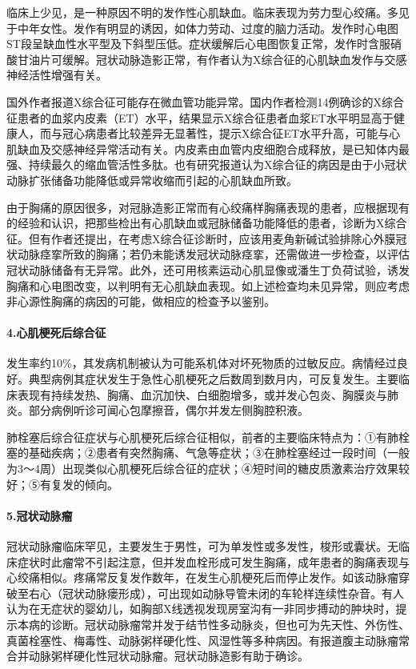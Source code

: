 临床上少见，是一种原因不明的发作性心肌缺血。临床表现为劳力型心绞痛。多见于中年女性。发作有明显的诱因，如体力劳动、过度的脑力活动。发作时心电图ST段呈缺血性水平型及下斜型压低。症状缓解后心电图恢复正常，发作时含服硝酸甘油片可缓解。冠状动脉造影正常，有作者认为X综合征的心肌缺血发作与交感神经活性增强有关。

国外作者报道X综合征可能存在微血管功能异常。国内作者检测14例确诊的X综合征患者的血浆内皮素（ET）水平，结果显示X综合征患者血浆ET水平明显高于健康人，而与冠心病患者比较差异无显著性，提示X综合征ET水平升高，可能与心肌缺血及交感神经异常活动有关。内皮素由血管内皮细胞合成释放，是已知体内最强、持续最久的缩血管活性多肽。也有研究报道认为X综合征的病因是由于小冠状动脉扩张储备功能降低或异常收缩而引起的心肌缺血所致。

由于胸痛的原因很多，对冠脉造影正常而有心绞痛样胸痛表现的患者，应根据现有的经验和认识，把那些检出有心肌缺血或冠脉储备功能降低的患者，诊断为X综合征。但有作者还提出，在考虑X综合征诊断时，应该用麦角新碱试验排除心外膜冠状动脉痉挛所致的胸痛；若仍未能诱发冠状动脉痉挛，还需做进一步检查，以评估冠状动脉储备有无异常。此外，还可用核素运动心肌显像或潘生丁负荷试验，诱发胸痛和心电图改变，以判明有无心肌缺血表现。如上述检查均未见异常，则应考虑非心源性胸痛的病因的可能，做相应的检查予以鉴别。

\paragraph{4.心肌梗死后综合征}

发生率约10\%，其发病机制被认为可能系机体对坏死物质的过敏反应。病情经过良好。典型病例其症状发生于急性心肌梗死之后数周到数月内，可反复发生。主要临床表现有持续发热、胸痛、血沉加快、白细胞增多，或并发心包炎、胸膜炎与肺炎。部分病例听诊可闻心包摩擦音，偶尔并发左侧胸腔积液。

肺栓塞后综合征症状与心肌梗死后综合征相似，前者的主要临床特点为：①有肺栓塞的基础疾病；②患者有突然胸痛、气急等症状；③在肺栓塞经过一段时间（一般为3～4周）出现类似心肌梗死后综合征的症状；④短时间的糖皮质激素治疗效果较好；⑤有复发的倾向。

\paragraph{5.冠状动脉瘤}

冠状动脉瘤临床罕见，主要发生于男性，可为单发性或多发性，梭形或囊状。无临床症状时此瘤常不引起注意，但并发血栓形成可发生胸痛，成年患者的胸痛表现与心绞痛相似。疼痛常反复发作数年，在发生心肌梗死后而停止发作。如该动脉瘤穿破至右心（冠状动脉瘘形成），可出现如动脉导管未闭的车轮样连续性杂音。有人认为在无症状的婴幼儿，如胸部X线透视发现房室沟有一非同步搏动的肿块时，提示本病的诊断。冠状动脉瘤常并发于结节性多动脉炎，但也可为先天性、外伤性、真菌栓塞性、梅毒性、动脉粥样硬化性、风湿性等多种病因。有报道腹主动脉瘤常合并动脉粥样硬化性冠状动脉瘤。冠状动脉造影有助于确诊。

